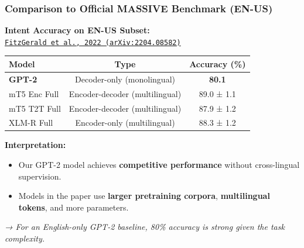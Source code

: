 \documentclass{beamer}
\begin{document}
\begin{frame}
  \frametitle{Comparison to Official MASSIVE Benchmark (EN-US)}
  
  \textbf{Intent Accuracy on EN-US Subset:} \\[0.5em]
  \href{https://arxiv.org/pdf/2204.08582}{\texttt{FitzGerald et al., 2022 (arXiv:2204.08582)}}
    
  \begin{tabular}{lcc}
    \toprule
    \textbf{Model} & \textbf{Type} & \textbf{Accuracy (\%)} \\
    \midrule
    \textbf{GPT-2} & Decoder-only (monolingual) & \textbf{80.1} \\
    mT5 Enc Full & Encoder-decoder (multilingual) & 89.0 ± 1.1 \\
    mT5 T2T Full & Encoder-decoder (multilingual) & 87.9 ± 1.2 \\
    XLM-R Full & Encoder-only (multilingual) & 88.3 ± 1.2 \\
    \bottomrule
  \end{tabular}
    
  \vspace{1em}
  \textbf{Interpretation:}
  \begin{itemize}
    \item Our GPT-2 model achieves \textbf{competitive performance} without cross-lingual supervision.
    \item Models in the paper use \textbf{larger pretraining corpora}, \textbf{multilingual tokens}, and more parameters.
  \end{itemize}
    
  \textit{→ For an English-only GPT-2 baseline, 80\% accuracy is strong given the task complexity.}
\end{frame}
\end{document}
